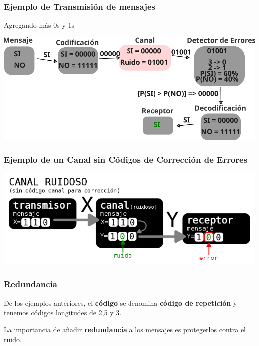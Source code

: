 \begin{frame}
	\frametitle{Ejemplo de Transmisión de mensajes}
	
		{
		
		\huge
		
		\centering
		
		Agregando más 0s y 1s
		\vspace*{0.5cm} 
		
	}
	
	
	
	{	
		
		\centering
		
		\includegraphics[width=0.7\linewidth]{img/img21}
		
		
	}
	
	
	
\end{frame}


\begin{frame}
	\frametitle{Ejemplo de un Canal sin Códigos de Corrección de Errores}
	
	
{	

	\centering
	
	\includegraphics[width=0.7\linewidth]{img/img3}


}

	
\end{frame}

\begin{frame}
	\frametitle{Redundancia}
	
	
	De los ejemplos anteriores, el \textbf{código} se denomina \textbf{código de repetición} y tenemos códigos longitudes de 2,5 y 3.
	
	\vspace*{0.5cm}
	
	La importancia de añadir \textbf{redundancia} a los mensajes es protegerlos contra el ruido.
	
	
\end{frame}
